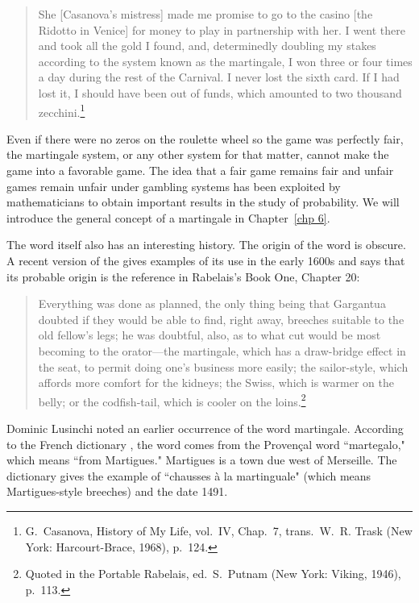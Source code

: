\begin{quote}
 She [Casanova's mistress] made me promise to go to the casino [the
Ridotto in Venice] for money to play in partnership with her.  I went there
and
took all the gold I found, and, determinedly doubling my stakes according to
the system known as the martingale, I won three or four times a day during
the
rest of the Carnival.  I never lost the sixth card.  If I had lost it, I
should
have been out of funds, which amounted to two thousand zecchini.\footnote{G.~Casanova, \emx
{History of My Life,} vol.~IV, Chap.~7, trans.\
W.~R. Trask (New York: Harcourt-Brace, 1968), p.~124.}
\end{quote}

Even if there were no zeros on the roulette wheel so the game was perfectly
fair, the martingale system, or any other system for that matter, cannot make
the game into a favorable game.  The idea that a fair game remains fair and
unfair games remain unfair under gambling systems has been exploited by mathematicians 
to obtain important results in the study of probability.  We will introduce the general 
concept of a martingale in Chapter~\ref{chp 6}.

The word  itself also has an interesting 
history.  The origin of the word is obscure.  A recent version of the  gives examples
of its use in the early 1600s and says that its probable origin is the reference
in Rabelais's\index{RABELAIS, F.} Book One, Chapter 20:

\begin{quote} 
Everything was done as planned, the only thing being that Gargantua
doubt\-ed if they would be able to find, right away, breeches suitable to the
old fellow's legs; he was doubtful, also, as to what cut would be most
becoming to the orator---the martingale, which has a draw-bridge effect in the seat,
to permit doing one's business more easily; the sailor-style, which affords more
comfort for the kidneys; the Swiss, which is warmer on the belly; or the
codfish-tail, which is cooler on the loins.\footnote{Quoted in the \emx
{Portable Rabelais,} ed.~S.~Putnam (New York: Viking, 1946), p.~113.}
\end{quote}

Dominic Lusinchi noted an earlier occurrence of the word martingale.  According to the French dictionary ,
the word comes from the Proven\c{c}al word ``martegalo," which means ``from Martigues."  Martigues is a town due west of Merseille.  The dictionary gives the example of ``chausses \`{a} la martinguale" (which means Martigues-style breeches) and the date 1491.  

